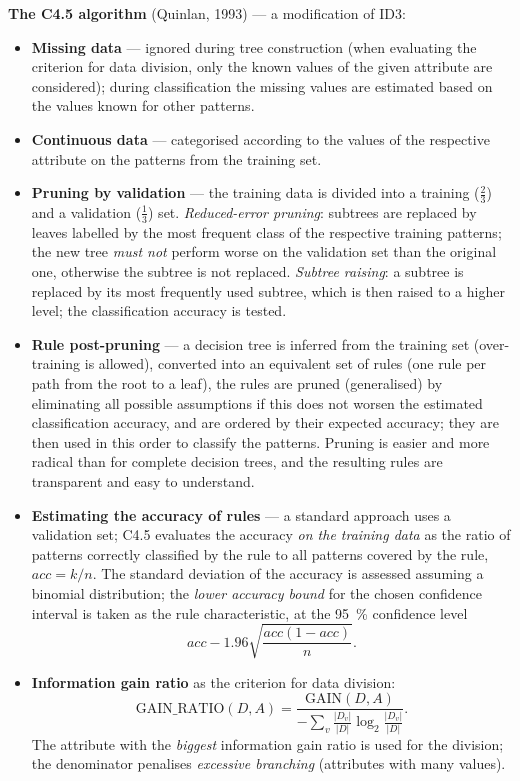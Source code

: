 \documentclass[11pt,a4paper]{article}
\theoremstyle{definition}
\begin{document}
\textbf{The C4.5 algorithm} (Quinlan, 1993) --- a modification of ID3:
\begin{itemize}
\item \textbf{Missing data} --- ignored during tree construction (when evaluating the criterion
      for data division, only the known values of the given attribute are considered); during
      classification the missing values are estimated based on the values known for other
      patterns.
\item \textbf{Continuous data} --- categorised according to the values of the respective attribute
      on the patterns from the training set.
\item \textbf{Pruning by validation} --- the training data is divided into a training
      ($\tfrac23$) and a validation ($\tfrac13$) set. \emph{Reduced-error pruning}: subtrees are
      replaced by leaves labelled by the most frequent class of the respective training patterns;
      the new tree \emph{must not} perform worse on the validation set than the original one,
      otherwise the subtree is not replaced. \emph{Subtree raising}: a subtree is replaced by its
      most frequently used subtree, which is then raised to a higher level; the classification
      accuracy is tested.
\item \textbf{Rule post-pruning} --- a decision tree is inferred from the training set
      (over-training is allowed), converted into an equivalent set of rules (one rule per path
      from the root to a leaf), the rules are pruned (generalised) by eliminating all possible
      assumptions if this does not worsen the estimated classification accuracy, and are ordered
      by their expected accuracy; they are then used in this order to classify the patterns.
      Pruning is easier and more radical than for complete decision trees, and the resulting
      rules are transparent and easy to understand.
\item \textbf{Estimating the accuracy of rules} --- a standard approach uses a validation set;
      C4.5 evaluates the accuracy \emph{on the training data} as the ratio of patterns correctly
      classified by the rule to all patterns covered by the rule, $\mathit{acc}=k/n$. The standard
      deviation of the accuracy is assessed assuming a binomial distribution; the
      \emph{lower accuracy bound} for the chosen confidence interval is taken as the rule
      characteristic, at the 95~\% confidence level
      \[ \mathit{acc}-1.96\sqrt{\frac{\mathit{acc}(1-\mathit{acc})}{n}}. \]
\item \textbf{Information gain ratio} as the criterion for data division:
      \[ \mathrm{GAIN\_RATIO}(D,A)=\frac{\mathrm{GAIN}(D,A)}
         {-\sum_{v}\frac{|D_v|}{|D|}\log_2\frac{|D_v|}{|D|}}. \]
      The attribute with the \emph{biggest} information gain ratio is used for the division; the
      denominator penalises \emph{excessive branching} (attributes with many values).
\end{itemize}
\end{document}
